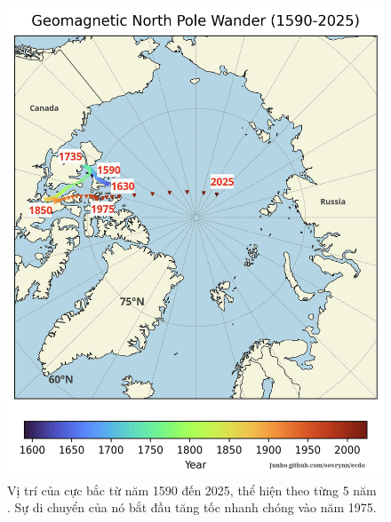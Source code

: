 \documentclass[10pt,twocolumn,letterpaper]{article}
\begin{document}
\begin{figure}[t]
\begin{center}
   \includegraphics[width=1\linewidth]{npw.jpg}
\end{center}
   \caption{Vị trí của cực bắc từ năm 1590 đến 2025, thể hiện theo từng 5 năm \cite{41}. Sự di chuyển của nó bắt đầu tăng tốc nhanh chóng vào năm 1975.}
\label{fig:13}
\label{fig:onecol}
\end{figure}
\end{document}
